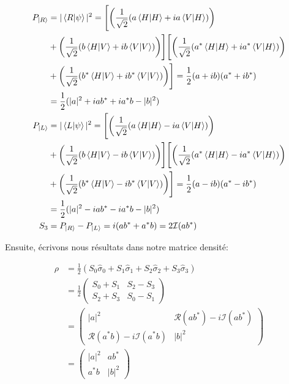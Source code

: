 \begin{onehalfspace}
    \begin{align}
        P_{\ket{R}} &= |\bra{R}\ket{\psi}|^2 = \Biggl[\biggl(\frac{1}{\sqrt{2}}(a\bra{H}\ket{H} + ia\bra{V}\ket{H})\biggr)\\ 
        &+ \biggl(\frac{1}{\sqrt{2}}(b\bra{H}\ket{V} + ib\bra{V}\ket{V})\biggr)\Biggr]\Biggl[ \biggl(\frac{1}{\sqrt{2}}(a^*\bra{H}\ket{H} + ia^*\bra{V}\ket{H})\biggr)\\
        &+ \biggl(\frac{1}{\sqrt{2}}(b^*\bra{H}\ket{V} + ib^*\bra{V}\ket{V})\biggr) \Biggr] = \frac{1}{2}(a + ib)(a^* + ib^*)\\
        &= \frac{1}{2}(|a|^2 + iab^* + ia^*b - |b|^2)\\
        P_{\ket{L}} &= |\bra{L}\ket{\psi}|^2 = \Biggl[\biggl(\frac{1}{\sqrt{2}}(a\bra{H}\ket{H} - ia\bra{V}\ket{H})\biggr)\\ 
        &+ \biggl(\frac{1}{\sqrt{2}}(b\bra{H}\ket{V} - ib\bra{V}\ket{V})\biggr)\Biggr]\Biggl[ \biggl(\frac{1}{\sqrt{2}}(a^*\bra{H}\ket{H} - ia^*\bra{V}\ket{H})\biggr)\\
        &+ \biggl(\frac{1}{\sqrt{2}}(b^*\bra{H}\ket{V} - ib^*\bra{V}\ket{V})\biggr) \Biggr] = \frac{1}{2}(a - ib)(a^* - ib^*)\\
        &= \frac{1}{2}(|a|^2 - iab^* - ia^*b - |b|^2)\\
        S_3 &= P_{\ket{R}} - P_{\ket{L}} = i(ab^* + a^*b) = 2\mathcal{I}(ab^*)
    \end{align}

    \noindent Ensuite, écrivons nous résultats dans notre matrice 
    densité:
    

    \begin{align}
        \rho &= \frac{1}{2}(S_0\hat{\sigma}_0 + S_1\hat{\sigma}_1 + S_2\hat{\sigma}_2 + S_3\hat{\sigma}_3)\\
        &= \frac{1}{2}\begin{pmatrix}
            S_0 + S_1 & S_2 -S_3\\
            S_2 + S_3 & S_0 - S_1
        \end{pmatrix}\\
        &= \begin{pmatrix}
            |a|^2 & \mathcal{R}(ab^*) - i\mathcal{I}(ab^*)\\
            \mathcal{R}(a^*b) - i\mathcal{I}(a^*b) & |b|^2
        \end{pmatrix}\\
        &= \begin{pmatrix}
            |a|^2 & ab^*\\
            a^*b & |b|^2
        \end{pmatrix}
    \end{align}


\end{onehalfspace}
